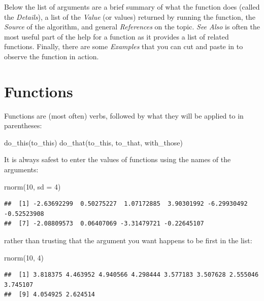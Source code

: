 \documentclass[
]{book}
\newenvironment{Shaded}{\begin{snugshade}}{\end{snugshade}}
\newcommand{\AttributeTok}[1]{\textcolor[rgb]{0.77,0.63,0.00}{#1}}
\newcommand{\DecValTok}[1]{\textcolor[rgb]{0.00,0.00,0.81}{#1}}
\newcommand{\FunctionTok}[1]{\textcolor[rgb]{0.00,0.00,0.00}{#1}}
\newcommand{\NormalTok}[1]{#1}
\begin{document}
Below the list of arguments are a brief summary of what the function does (called the \emph{Details}), a list of the \emph{Value} (or values) returned by running the function, the \emph{Source} of the algorithm, and general \emph{References} on the topic. \emph{See Also} is often the most useful part of the help for a function as it provides a list of related functions. Finally, there are some \emph{Examples} that you can cut and paste in to observe the function in action.

\hypertarget{functions}{%
\section{Functions}\label{functions}}

Functions are (most often) verbs, followed by what they will be applied to in parentheses:

\begin{Shaded}
\begin{Highlighting}[]
\FunctionTok{do\_this}\NormalTok{(to\_this)}
\FunctionTok{do\_that}\NormalTok{(to\_this, to\_that, with\_those)}
\end{Highlighting}
\end{Shaded}

It is always safest to enter the values of functions using the names of the arguments:

\begin{Shaded}
\begin{Highlighting}[]
\FunctionTok{rnorm}\NormalTok{(}\DecValTok{10}\NormalTok{, }\AttributeTok{sd =} \DecValTok{4}\NormalTok{)}
\end{Highlighting}
\end{Shaded}

\begin{verbatim}
##  [1] -2.63692299  0.50275227  1.07172885  3.90301992 -6.29930492 -0.52523908
##  [7] -2.08809573  0.06407069 -3.31479721 -0.22645107
\end{verbatim}

rather than trusting that the argument you want happens to be first in the list:

\begin{Shaded}
\begin{Highlighting}[]
\FunctionTok{rnorm}\NormalTok{(}\DecValTok{10}\NormalTok{, }\DecValTok{4}\NormalTok{)}
\end{Highlighting}
\end{Shaded}

\begin{verbatim}
##  [1] 3.818375 4.463952 4.940566 4.298444 3.577183 3.507628 2.555046 3.745107
##  [9] 4.054925 2.624514
\end{verbatim}
\end{document}
